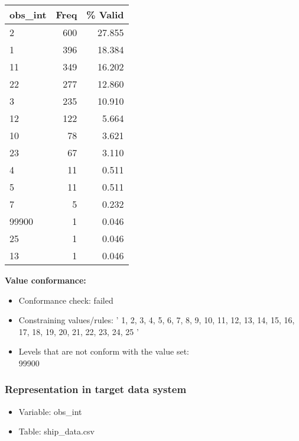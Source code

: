 \documentclass[
]{article}
\providecommand{\tightlist}{%
  \setlength{\itemsep}{0pt}\setlength{\parskip}{0pt}}
\begin{document}
\begin{table}[H]
\centering
\begin{tabular}{l|r|r}
\hline
\textbf{obs\_int} & \textbf{Freq} & \textbf{\% Valid}\\
\hline
2 & 600 & 27.855\\
\hline
1 & 396 & 18.384\\
\hline
11 & 349 & 16.202\\
\hline
22 & 277 & 12.860\\
\hline
3 & 235 & 10.910\\
\hline
12 & 122 & 5.664\\
\hline
10 & 78 & 3.621\\
\hline
23 & 67 & 3.110\\
\hline
4 & 11 & 0.511\\
\hline
5 & 11 & 0.511\\
\hline
7 & 5 & 0.232\\
\hline
99900 & 1 & 0.046\\
\hline
25 & 1 & 0.046\\
\hline
13 & 1 & 0.046\\
\hline
\end{tabular}
\end{table}

\textbf{Value conformance:}

\begin{itemize}
\tightlist
\item
  Conformance check: failed
\item
  Constraining values/rules: ' 1, 2, 3, 4, 5, 6, 7, 8, 9, 10, 11, 12,
  13, 14, 15, 16, 17, 18, 19, 20, 21, 22, 23, 24, 25 '
\item
  Levels that are not conform with the value set:\\
  99900
\end{itemize}

\newpage

\hypertarget{representation-in-target-data-system-19}{%
\subsubsection{\texorpdfstring{Representation in \textbf{target} data
system}{Representation in target data system}}\label{representation-in-target-data-system-19}}

\begin{itemize}
\tightlist
\item
  Variable: obs\_int
\item
  Table: ship\_data.csv
\end{itemize}
\end{document}
